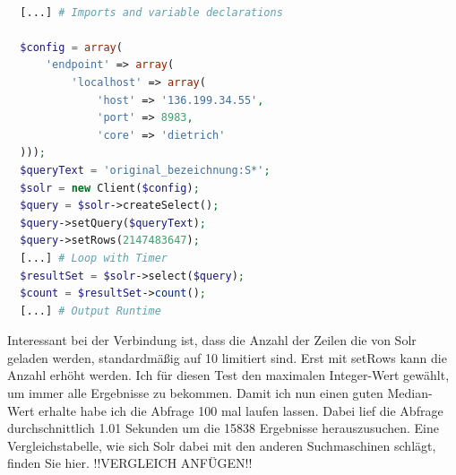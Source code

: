 \begin{lstlisting}[language=php, frame=single, label={lst:SolrPhp}, 
  morekeywords={type,uninvertible,indexed,stored,field,multiValued, name}] 

  [...] # Imports and variable declarations

  $config = array(
      'endpoint' => array(
          'localhost' => array(
              'host' => '136.199.34.55',
              'port' => 8983,
              'core' => 'dietrich'
  )));
  $queryText = 'original_bezeichnung:S*';
  $solr = new Client($config);
  $query = $solr->createSelect();
  $query->setQuery($queryText);
  $query->setRows(2147483647); 
  [...] # Loop with Timer
  $resultSet = $solr->select($query);
  $count = $resultSet->count();
  [...] # Output Runtime
\end{lstlisting}

Interessant bei der Verbindung ist, dass die Anzahl der Zeilen die von Solr geladen werden, standardmäßig auf 10 limitiert sind. Erst mit setRows kann die Anzahl erhöht werden. Ich für diesen Test den maximalen Integer-Wert gewählt, um immer alle Ergebnisse zu bekommen. Damit ich nun einen guten Median-Wert erhalte habe ich die Abfrage 100 mal laufen lassen. Dabei lief die Abfrage durchschnittlich 1.01 Sekunden um die 15838 Ergebnisse herauszusuchen. Eine Vergleichstabelle, wie sich Solr dabei mit den anderen Suchmaschinen schlägt, finden Sie hier. !!VERGLEICH ANFÜGEN!!
